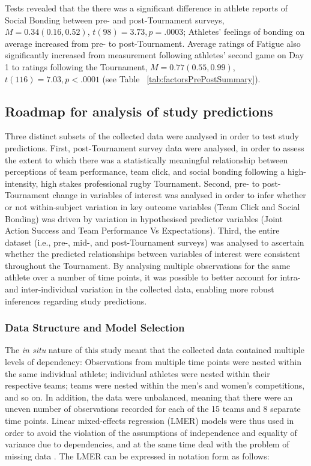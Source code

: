  Tests revealed that the there was a significant difference in athlete reports of Social Bonding between pre- and post-Tournament surveys, $M = 0.34 (0.16, 0.52)$, $t(98)= 3.73, p = .0003$; Athletes' feelings of bonding on average increased from pre- to post-Tournament.  Average ratings of Fatigue also significantly increased from measurement following athletes' second game on Day 1 to ratings following the Tournament, $M =  0.77 (0.55, 0.99)$, $t(116)= 7.03, p < .0001$ (see Table ~\ref{tab:factorsPrePostSummary}).

 \begin{landscape}
 
 \restoregeometry



\subsection{Roadmap for analysis of study predictions}
Three distinct subsets of the collected data were analysed in order to test study predictions. First, post-Tournament survey data were analysed, in order to assess the extent to which there was a statistically meaningful relationship between perceptions of team performance, team click, and social bonding following a high-intensity, high stakes professional rugby Tournament.  Second, pre- to post-Tournament change in variables of interest was analysed in order to infer whether or not within-subject variation in key outcome variables (Team Click and Social Bonding) was driven by variation in hypothesised predictor variables (Joint Action Success and Team Performance Vs Expectations). Third, the entire dataset (i.e., pre-, mid-, and post-Tournament surveys) was analysed to ascertain whether the predicted relationships between variables of interest were consistent throughout the Tournament.  By analysing multiple observations for the same athlete over a number of time points, it was possible to better account for intra- and inter-individual variation in the collected data, enabling more robust inferences regarding study predictions.

\subsubsection{Data Structure and Model Selection}
The \textit{in situ} nature of this study meant that the collected data contained multiple levels of dependency: Observations from multiple time points were nested within the same individual athlete; individual athletes were nested within their respective teams; teams were nested within the men’s and women’s competitions, and so on.  In addition, the data were unbalanced, meaning that there were an uneven number of observations recorded for each of the 15 teams and 8 separate time points. Linear mixed-effects regression (LMER) models were thus used in order to avoid the violation of the assumptions of independence and equality of variance due to dependencies, and at the same time deal with the problem of missing data \citep{Quene2004,Field2012}.  The LMER can be expressed in notation form as follows:


\end{landscape}
